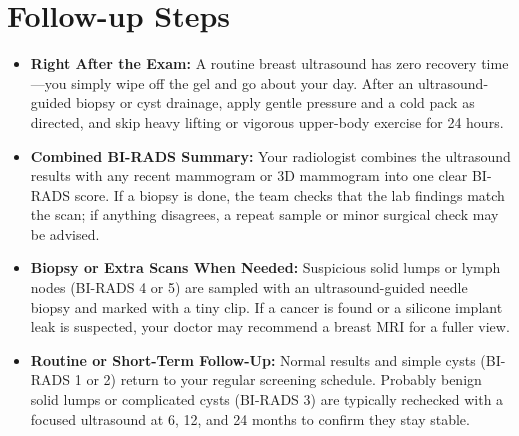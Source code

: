 \section{Follow-up Steps}
\begin{itemize}
\item \textbf{Right After the Exam:} A routine breast ultrasound has zero recovery time---you simply wipe off the gel and go about your day. After an ultrasound-guided biopsy or cyst drainage, apply gentle pressure and a cold pack as directed, and skip heavy lifting or vigorous upper-body exercise for 24 hours.
\item \textbf{Combined BI-RADS Summary:} Your radiologist combines the ultrasound results with any recent mammogram or 3D mammogram into one clear BI-RADS score. If a biopsy is done, the team checks that the lab findings match the scan; if anything disagrees, a repeat sample or minor surgical check may be advised.
\item \textbf{Biopsy or Extra Scans When Needed:} Suspicious solid lumps or lymph nodes (BI-RADS 4 or 5) are sampled with an ultrasound-guided needle biopsy and marked with a tiny clip. If a cancer is found or a silicone implant leak is suspected, your doctor may recommend a breast MRI for a fuller view.
\item \textbf{Routine or Short-Term Follow-Up:} Normal results and simple cysts (BI-RADS 1 or 2) return to your regular screening schedule. Probably benign solid lumps or complicated cysts (BI-RADS 3) are typically rechecked with a focused ultrasound at 6, 12, and 24 months to confirm they stay stable.
\end{itemize}

